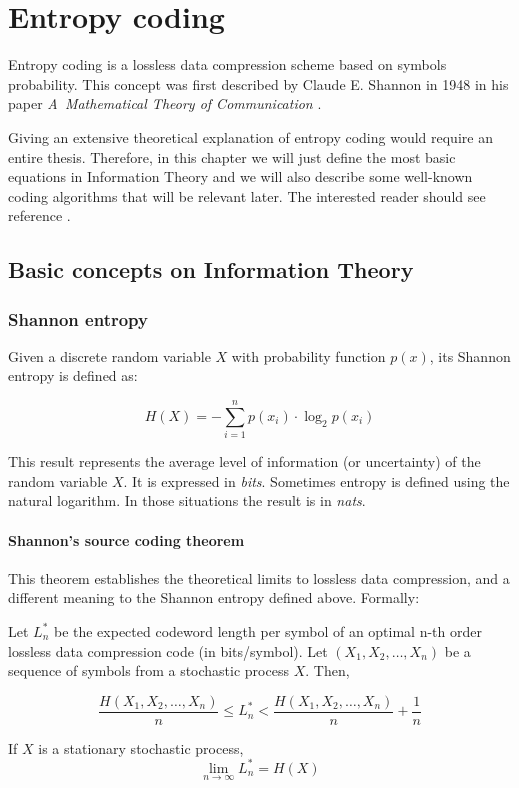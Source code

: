 \chapter{Entropy coding} \label{ch:entropy_coding}
Entropy coding is a lossless data compression scheme based on symbols probability. This concept was first described by Claude E. Shannon in 1948 in his paper \textit{A~Mathematical Theory of Communication} \parencite{Shannon1948}.

Giving an extensive theoretical explanation of entropy coding would require an entire thesis. Therefore, in this chapter we will just define the most basic equations in Information Theory and we will also describe some well-known coding algorithms that will be relevant later. The interested reader should see reference \parencite{cover}.

\section{Basic concepts on Information Theory}
\subsection{Shannon entropy}
Given a discrete random variable $X$ with probability function $p(x)$, its Shannon entropy is defined as:

\begin{equation}
H(X) = - \sum_{i=1}^{n} p(x_i) \cdot \log_2 p(x_i) 
\end{equation}

This result represents the average level of information (or uncertainty) of the random variable $X$. It is expressed in \textit{bits}. Sometimes entropy is defined using the natural logarithm. In those situations the result is in \textit{nats}.

\subsubsection{Shannon's source coding theorem}
This theorem establishes the theoretical limits to lossless data compression, and a different meaning to the Shannon entropy defined above. Formally:

\begin{theorem}
Let $L_n^*$ be the expected codeword length per symbol of an optimal n-th order lossless data compression code (in bits/symbol). Let $(X_1, X_2, \dots, X_n )$ be a sequence of symbols from a stochastic process $X$. Then,

\begin{equation}
	\frac{H(X_1, X_2, \dots, X_n )}{n} \leq L_n^* < \frac{H(X_1, X_2, \dots, X_n )}{n} + \frac{1}{n}
\end{equation}

If $X$ is a stationary stochastic process,
\begin{equation}
	\lim_{n \to \infty} L_n^* = H(X)
\end{equation}
\end{theorem}

